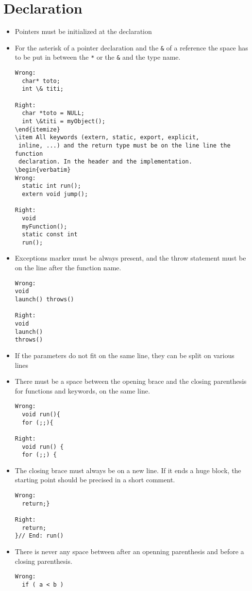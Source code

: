 \documentclass{article}
\begin{document}
\section{Declaration}
\begin{itemize}
\item Pointers must be initialized at the declaration
\item  For the asterisk of a pointer declaration and the \texttt{\&} of a 
reference the space has to be put in between the \texttt{*} or the 
\texttt{\&} and the type name.
 \begin{verbatim}
Wrong:
  char* toto;
  int \& titi;

Right:
  char *toto = NULL;
  int \&titi = myObject();
\end{itemize}
\item All keywords (extern, static, export, explicit,
 inline, ...) and the return type must be on the line line the function
 declaration. In the header and the implementation.
\begin{verbatim}
Wrong:
  static int run(); 
  extern void jump();

Right:
  void
  myFunction();
  static const int
  run();
\end{verbatim}
\item Exceptions marker must be always present, and the throw statement
must be on the line after the function name.
\begin{verbatim}
Wrong:
void 
launch() throws()

Right:
void
launch()
throws()
\end{verbatim}

\item If the parameters do not fit on the same line, they can be split on 
various lines
\item There must be a space between the opening brace and the closing
 parenthesis for functions and keywords, on the same line.
\begin{verbatim}
Wrong:
  void run(){
  for (;;){

Right:
  void run() {
  for (;;) {
\end{verbatim}

\item The closing brace must always be on a new line. If it ends a huge 
block, the starting point should be precised in a short comment.
\begin{verbatim}
Wrong:
  return;}

Right:
  return;
}// End: run()
\end{verbatim}
\item There is never any space between after an openning
 parenthesis and before a closing parenthesis.
\begin{verbatim}
Wrong:
  if ( a < b )


\end{verbatim}
\end{itemize}
\end{document}
